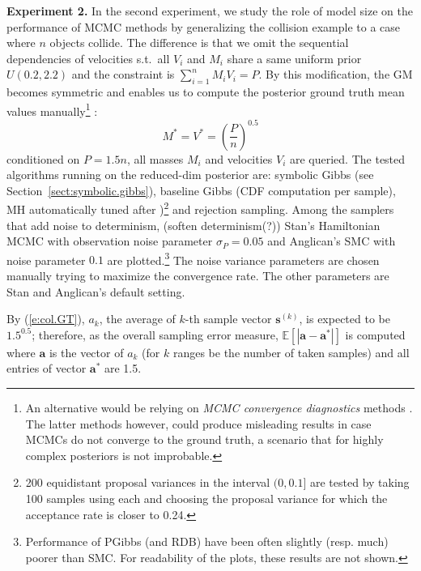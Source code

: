 \documentclass{article}
\newcommand{\bvec}[1]{\textbf{#1}}
\begin{document}
\textbf{Experiment 2.} In the second experiment,
we study the role of model size on the performance of MCMC methods by generalizing the collision example to a case where $n$ objects 
collide. The difference is that we omit the sequential dependencies of velocities s.t.\ all $V_i$ and $M_i$ share a same uniform prior $U(0.2, 2.2)$ and the constraint is $\sum_{i=1}^n{M_i V_i} = P$. By this modification, the GM becomes symmetric and enables us to compute the posterior ground truth mean values manually\footnote{An alternative would be relying on \emph{MCMC convergence diagnostics} methods \cite{cowles1996markov}. The latter methods however, could produce misleading results in case MCMCs do not converge to the ground truth, a scenario that for highly complex posteriors is not improbable.}%
:
\begin{equation}
\label{e:col.GT}
M^* = V^* = \left(\frac{P}{n}\right)^{0.5}
\end{equation}
conditioned on $P = 1.5 n$, all masses $M_i$ and velocities  $V_i$ are queried. 
The tested algorithms running on the reduced-dim posterior are: 
symbolic Gibbs (see Section~\ref{sect:symbolic.gibbs}), 
baseline Gibbs (CDF computation per sample), 
MH automatically tuned %
after \cite{roberts1997weak})\footnote{
\label{foot:tuning}
200 {\color{green} equidistant} proposal variances in the interval $(0, 0.1]$ are tested by taking 100 samples using each and  
choosing the proposal variance for which the acceptance rate is closer to 0.24.
} and rejection sampling.
Among the samplers that add noise to determinism, {\color{green}(soften determinism(?))} 
Stan's Hamiltonian MCMC with observation noise parameter 
$\sigma_P = 0.05$ and Anglican's SMC with noise parameter $0.1$ are plotted.\footnote{
Performance of PGibbs (and RDB) have been often slightly (resp. much) poorer than SMC.
For readability of the plots, these results are not shown. 
} 
The noise variance parameters are chosen manually trying to maximize the convergence rate.
The other parameters are Stan and Anglican's default setting.

By (\ref{e:col.GT}), $a_k$, the average  of $k$-th sample vector $\bvec{s}^{(k)}$,
is expected to be $1.5^{0.5}$;   
therefore, as the overall sampling error measure, 
$\mathbb{E}[|\bvec{a} - \bvec{a}^*|]$ is computed where
$\bvec{a}$ is the vector of $a_k$ (for $k$ ranges be the number of taken samples) and all entries of vector $\bvec{a}^*$ are 1.5.
\end{document}
